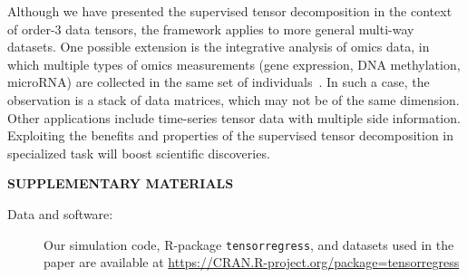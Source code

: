 \documentclass[12pt]{article}
\theoremstyle{definition}
\theoremstyle{definition}
\begin{document}
Although we have presented the supervised tensor decomposition in the context of order-3 data tensors, the framework applies to more general multi-way datasets. One possible extension is the integrative analysis of omics data, in which multiple types of omics measurements (gene expression, DNA methylation, microRNA) are collected in the same set of individuals~\citep{lock2013joint}. In such a case, the observation is a stack of data matrices, which may not be of the same dimension. 
Other applications include time-series tensor data with multiple side information. Exploiting the benefits and properties of the supervised tensor decomposition in specialized task will boost scientific discoveries.


\bigskip
\begin{center}
{\large \bf SUPPLEMENTARY MATERIALS}
\end{center}

\begin{description}
\item[Data and software:] %
Our simulation code, R-package \texttt{tensorregress}, and datasets used in the paper are available at \url{https://CRAN.R-project.org/package=tensorregress} 
\end{description}



\end{document}
